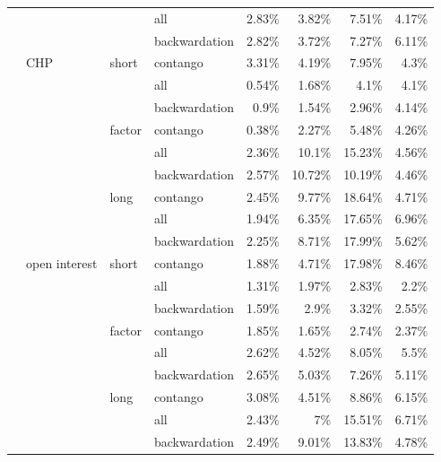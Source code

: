 \documentclass[]{elsarticle} %
\begin{document}
\begin{longtable}[t]{>{}llllrrrr}
\nopagebreak
 &  &  & all & 2.83\% & 3.82\% & 7.51\% & 4.17\%\\
\nopagebreak
 &  &  & backwardation & 2.82\% & 3.72\% & 7.27\% & 6.11\%\\
\nopagebreak
 & \multirow[t]{-9}{*}{\raggedright\arraybackslash CHP} & \multirow[t]{-3}{*}{\raggedright\arraybackslash short} & contango & 3.31\% & 4.19\% & 7.95\% & 4.3\%\\
\nopagebreak
 &  &  & all & 0.54\% & 1.68\% & 4.1\% & 4.1\%\\
\nopagebreak
 &  &  & backwardation & 0.9\% & 1.54\% & 2.96\% & 4.14\%\\
\nopagebreak
 &  & \multirow[t]{-3}{*}{\raggedright\arraybackslash factor} & contango & 0.38\% & 2.27\% & 5.48\% & 4.26\%\\
\nopagebreak
 &  &  & all & 2.36\% & 10.1\% & 15.23\% & 4.56\%\\
\nopagebreak
 &  &  & backwardation & 2.57\% & 10.72\% & 10.19\% & 4.46\%\\
\nopagebreak
 &  & \multirow[t]{-3}{*}{\raggedright\arraybackslash long} & contango & 2.45\% & 9.77\% & 18.64\% & 4.71\%\\
\nopagebreak
 &  &  & all & 1.94\% & 6.35\% & 17.65\% & 6.96\%\\
\nopagebreak
 &  &  & backwardation & 2.25\% & 8.71\% & 17.99\% & 5.62\%\\
\nopagebreak
 & \multirow[t]{-9}{*}{\raggedright\arraybackslash open interest} & \multirow[t]{-3}{*}{\raggedright\arraybackslash short} & contango & 1.88\% & 4.71\% & 17.98\% & 8.46\%\\
\nopagebreak
 &  &  & all & 1.31\% & 1.97\% & 2.83\% & 2.2\%\\
\nopagebreak
 &  &  & backwardation & 1.59\% & 2.9\% & 3.32\% & 2.55\%\\
\nopagebreak
 &  & \multirow[t]{-3}{*}{\raggedright\arraybackslash factor} & contango & 1.85\% & 1.65\% & 2.74\% & 2.37\%\\
\nopagebreak
 &  &  & all & 2.62\% & 4.52\% & 8.05\% & 5.5\%\\
\nopagebreak
 &  &  & backwardation & 2.65\% & 5.03\% & 7.26\% & 5.11\%\\
\nopagebreak
 &  & \multirow[t]{-3}{*}{\raggedright\arraybackslash long} & contango & 3.08\% & 4.51\% & 8.86\% & 6.15\%\\
\nopagebreak
 &  &  & all & 2.43\% & 7\% & 15.51\% & 6.71\%\\
\nopagebreak
 &  &  & backwardation & 2.49\% & 9.01\% & 13.83\% & 4.78\%\\

\end{longtable}
\end{document}
